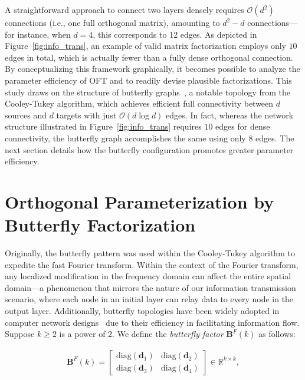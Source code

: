 A straightforward approach to connect two layers densely requires $\mathcal{O}(d^2)$ connections (i.e., one full orthogonal matrix), amounting to $d^2-d$ connections—for instance, when $d=4$, this corresponds to 12 edges. As depicted in Figure~\ref{fig:info_trans}, an example of valid matrix factorization employs only $10$ edges in total, which is actually fewer than a fully dense orthogonal connection. By conceptualizing this framework graphically, it becomes possible to analyze the parameter efficiency of OFT and to readily devise plausible factorizations. This study draws on the structure of butterfly graphs~\cite{cooley1965algorithm}, a notable topology from the Cooley-Tukey algorithm, which achieves efficient full connectivity between $d$ sources and $d$ targets with just $\mathcal{O}(d\log d)$ edges. In fact, whereas the network structure illustrated in Figure~\ref{fig:info_trans} requires $10$ edges for dense connectivity, the butterfly graph accomplishes the same using only $8$ edges. The next section details how the butterfly configuration promotes greater parameter efficiency.

\section{Orthogonal Parameterization by Butterfly Factorization}

Originally, the butterfly pattern was used within the Cooley-Tukey algorithm to expedite the fast Fourier transform. Within the context of the Fourier transform, any localized modification in the frequency domain can affect the entire spatial domain—a phenomenon that mirrors the nature of our information transmission scenario, where each node in an initial layer can relay data to every node in the output layer. Additionally, butterfly topologies have been widely adopted in computer network designs~\cite{solihin2015fundamentals,li2011linear} due to their efficiency in facilitating information flow. Suppose $k\geq 2$ is a power of $2$. We define the \emph{butterfly factor} $\bm{B}^F(k)$ as follows:

\begin{equation}\label{eq:but_factor}
\begin{aligned}
    \bm{B}^F(k)=\begin{bmatrix}
    \text{diag}(\bm{d}_1) & \text{diag}(\bm{d}_2) \\
    \text{diag}(\bm{d}_3) & \text{diag}(\bm{d}_4)
    \end{bmatrix}\in\mathbb{R}^{k\times k},
\end{aligned}
\end{equation}

